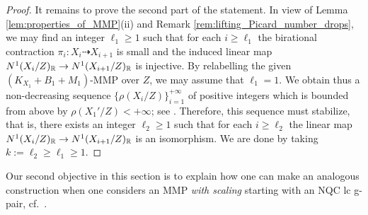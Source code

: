 	\begin{proof}
		It remains to prove the second part of the statement.
		In view of Lemma \ref{lem:properties_of_MMP}(ii) and Remark \ref{rem:lifting_Picard_number_drops}, we may find an integer $ \ell_1 \geq 1 $ such that for each $ i \geq \ell_1 $ the birational contraction $ \pi_i \colon X_i \dashrightarrow X_{i+1} $ is small and the induced linear map $ N^1(X_i/Z)_{\mathbb{R}} \to N^1(X_{i+1}/Z)_{\mathbb{R}} $ is injective. By relabelling the given $ (K_{X_1}+B_1+M_1)$-MMP over $Z$, we may assume that $ \ell_1 = 1 $. We obtain thus a non-decreasing sequence $ \big\{ \rho(X_i/Z) \big\}_{i=1}^{+\infty} $ of positive integers which is bounded from above by $ \rho(X_1'/Z) < +\infty $; see \cite[Corollary 5.19 and Theorem 6.3]{HaconLiu21}. Therefore, this sequence must stabilize, that is, there exists an integer $ \ell_2 \geq 1 $ such that for each $ i \geq \ell_2 $ the linear map $ N^1(X_i/Z)_{\mathbb{R}} \to N^1(X_{i+1}/Z)_{\mathbb{R}} $ is an isomorphism. We are done by taking $ k := \ell_2 \geq \ell_1 \geq 1 $.
	\end{proof}
	
	Our second objective in this section is to explain how one can make an analogous construction when one considers an MMP \emph{with scaling} starting with an NQC lc g-pair, cf.\ \cite[Subsection 2.5]{LT22b}.
	
	\medskip
	
	
